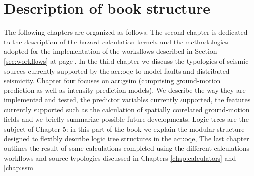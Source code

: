 \section{Description of book structure}
The following chapters are organized as follows. 
%
The second chapter is dedicated to the description of the hazard calculation
kernels and the methodologies adopted for the implementation of the worksflows
described in Section \ref{sec:workflows} at page \pageref{sec:workflows}. 
%
In the third chapter we discuss the typologies of seismic sources currently
supported by the \gls{acr:oqe} to model faults and distributed seismicity.
% 
Chapter four focuses on \gls{acr:gsim} (comprising ground-motion prediction as
well as intensity prediction models). We describe the way they are implemented
and tested, the predictor variables currently supported, the features currently
supported such as the calculation of spatially correlated ground-motion fields
and we briefly summarize possible future developments.
% 
Logic trees are the subject of Chapter 5; in this part of the book we explain
the modular structure designed to flexibly describe logic tree structures in the
\gls{acr:oqe}, 
% 
The last chapter outlines the result of some calculations completed using the
different calculations workflows and source typologies discussed in Chapters
\ref{chap:calculators} and \ref{chap:ssm}.

